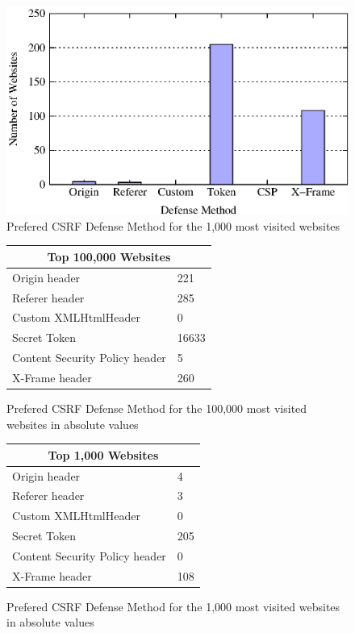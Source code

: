 \begin{figure}[htb]
	\includegraphics[scale=0.7]{figs/results_top}
	\caption{Prefered CSRF Defense Method for the 1,000 most visited websites}
	\label{fig:resultsTop}
\end{figure}

\begin{figure}
	\centering
		\begin{tabular}{|l|l|}
			\hline
			\multicolumn{2}{|c|}{Top 100,000 Websites} \\
			\hline
			Origin header & 221 \\
			\hline
			Referer header & 285 \\
			\hline
			Custom XMLHtmlHeader & 0 \\
			\hline
			Secret Token & 16633 \\
			\hline
			Content Security Policy header & 5 \\
			\hline
			X-Frame header & 260 \\
			\hline
	\end{tabular}
	\caption{Prefered CSRF Defense Method for the 100,000 most visited websites in absolute values}
	\label{table:resultsAll}
\end{figure}

\begin{figure}
	\centering
	\begin{tabular}{|l|l|}
			\hline
			\multicolumn{2}{|c|}{Top 1,000 Websites} \\
			\hline
			Origin header & 4 \\
			\hline
			Referer header & 3 \\
			\hline
			Custom XMLHtmlHeader & 0 \\
			\hline
			Secret Token & 205 \\
			\hline
			Content Security Policy header & 0 \\
			\hline
			X-Frame header & 108 \\
			\hline
	\end{tabular}
	\caption{Prefered CSRF Defense Method for the 1,000 most visited websites in absolute values}
	\label{table:resultsTop}
\end{figure}

